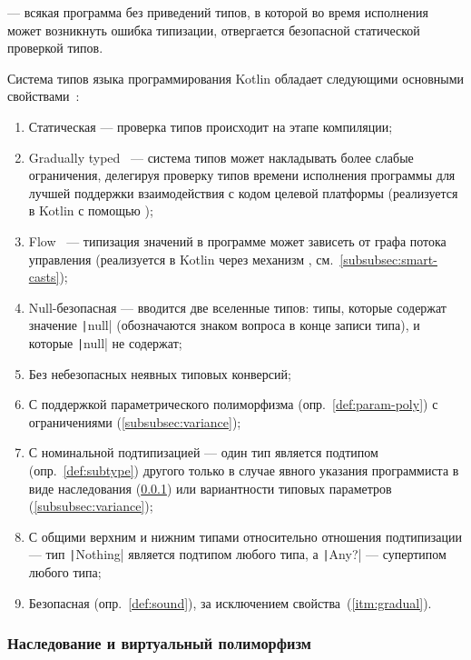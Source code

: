 \begin{definition}
    \label{def:sound}
     --- всякая программа без приведений типов, в которой во время исполнения может возникнуть ошибка типизации, отвергается безопасной статической проверкой типов.
\end{definition}

Система типов языка программирования Kotlin обладает следующими основными свойствами~\cite{akhin2021kotlin}:
\begin{enumerate}
    \item Статическая --- проверка типов происходит на этапе компиляции;
    \item\label{itm:gradual} Gradually typed~\cite{siek2007gradual} --- система типов может накладывать более слабые ограничения, делегируя проверку типов времени исполнения программы для лучшей поддержки взаимодействия с кодом целевой платформы (реализуется в Kotlin с помощью );
    \item Flow~\cite{pearce2013calculus} --- типизация значений в программе может зависеть от графа потока управления (реализуется в Kotlin через механизм , см.~\ref{subsubsec:smart-casts});
    \item Null-безопасная --- вводится две вселенные типов: типы, которые содержат значение \texttt|null| (обозначаются знаком вопроса в конце записи типа), и которые \texttt|null| не содержат;
    \item Без небезопасных неявных типовых конверсий;
    \item С поддержкой параметрического полиморфизма (опр.~\ref{def:param-poly}) с ограничениями (\ref{subsubsec:variance});
    \item С номинальной подтипизацией --- один тип является подтипом (опр.~\ref{def:subtype}) другого только в случае явного указания программиста в виде наследования (\ref{subsubsec:interitance-virtual}) или вариантности типовых параметров (\ref{subsubsec:variance});
    \item С общими верхним и нижним типами относительно отношения подтипизации --- тип \texttt|Nothing| является подтипом любого типа, а \texttt|Any?| --- супертипом любого типа;
    \item Безопасная (опр.~\ref{def:sound}), за исключением свойства~(\ref{itm:gradual}).
\end{enumerate}

\subsubsection{Наследование и виртуальный полиморфизм} \label{subsubsec:interitance-virtual}

